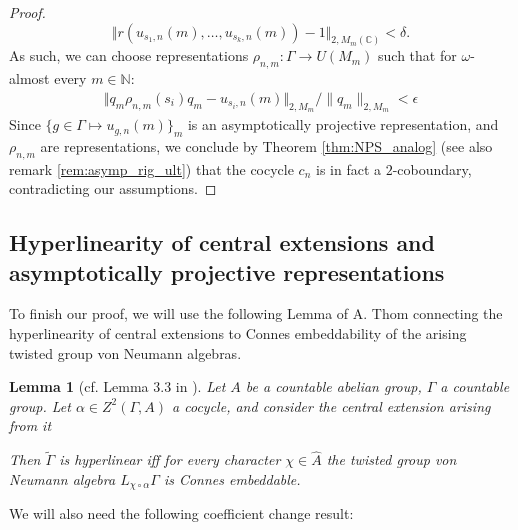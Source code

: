 \documentclass[11pt]{amsart}
\newcommand{\N}{{\mathbb{N}}}
\newcommand{\C}{{\mathbb{C}}}
\newtheorem{lemma}[theorem]{Lemma}
\theoremstyle{definition}
\theoremstyle{remark}
\theoremstyle{definition}
\begin{document}
\begin{proof}
$$ \Vert r(u_{s_1,n}(m), \dots, u_{s_k, n}(m)) - 1 \Vert_{2, M_m(\C)} < \delta.$$
As such, we can choose representations $\rho_{n,m}: \Gamma \to U(M_m)$ such that for $\omega$-almost every $m \in \N$:
\begin{align*}
    \Vert q_m \rho_{n,m}(s_i) q_m - u_{s_i, n}(m) \Vert_{2, M_m} / \| q_m\|_{2,M_m} < \epsilon 
\end{align*}
Since $\{ g\in \Gamma \mapsto u_{g,n}(m) \}_m$ is an asymptotically projective representation, and $\rho_{n,m}$ are representations, we conclude by Theorem \ref{thm:NPS_analog}  (see also remark \ref{rem:asymp_rig_ult}) that the cocycle $c_n$ is in fact a $2$-coboundary, contradicting our assumptions.
\end{proof}

\subsection{Hyperlinearity of central extensions and asymptotically projective representations}


To finish our proof, we will use the following Lemma of A. Thom \cite[Lemma 3.3]{Thom} connecting the hyperlinearity of central extensions to Connes embeddability of the arising twisted group von Neumann algebras.

\begin{lemma}[cf. Lemma 3.3 in \cite{Thom}] \label{lem:Thom}
Let $A$ be a countable abelian group, $\Gamma$ a countable group. Let  $\alpha \in Z^2(\Gamma, A)$ a cocycle, and consider the  central extension arising from it
\begin{center}
\end{center}
Then $\widetilde \Gamma$ is hyperlinear iff for every character $\chi \in \widehat{A}$ the twisted group von Neumann algebra $L_{\chi \circ \alpha}\Gamma$ is Connes embeddable.
\end{lemma}

We will also need the following coefficient change result:
\end{document}
